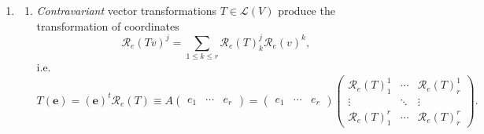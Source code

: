 \documentclass[aps,preprint]{revtex4}
\begin{document}
\begin{enumerate}
\item 
\begin{enumerate}
\item \emph{Contravariant} vector transformations $T\in \mathcal{L}\left(
V\right) $ produce the transformation of coordinates 
\begin{equation}
\mathcal{R}_{e}\left( Tv\right) ^{j}=\sum_{1\leq k\leq r}\mathcal{R}%
_{e}\left( T\right) _{k}^{j}\mathcal{R}_{e}\left( v\right) ^{k},
\end{equation}%
i.e. 
\begin{equation}
T\left( \boldsymbol{e}\right) =\left( \boldsymbol{e}\right) ^{t}\mathcal{R}%
_{e}\left( T\right) \equiv A\left( 
\begin{array}{ccc}
e_{1} & \cdots & e_{r}%
\end{array}%
\right) =\left( 
\begin{array}{ccc}
e_{1} & \cdots & e_{r}%
\end{array}%
\right) \left( 
\begin{array}{ccc}
\mathcal{R}_{e}\left( T\right) _{1}^{1} & \cdots & \mathcal{R}_{e}\left(
T\right) _{r}^{1} \\ 
\vdots & \ddots & \vdots \\ 
\mathcal{R}_{e}\left( T\right) _{1}^{r} & \cdots & \mathcal{R}_{e}\left(
T\right) _{r}^{r}%
\end{array}%
\right) .
\end{equation}


\end{enumerate}
\end{enumerate}
\end{document}
